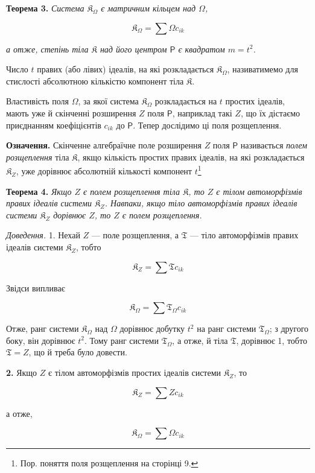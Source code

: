 \documentclass[11pt]{article}
\newcommand{\srcfn}[2]{\footnote{#2}}
\begin{document}
\textbf{Теорема 3.} \emph{Система \(\mathfrak K_\Omega\) є матричним кільцем над \(\Omega\),}

\[
\mathfrak K_\Omega=\sum\Omega c_{ik}
\]

\emph{а отже, степінь тіла \(\mathfrak K\) над його центром \(\mathsf P\) є квадратом \(m=t^2\).}

Число \(t\) правих (або лівих) ідеалів, на які розкладається \(\mathfrak K_\Omega\), називатимемо для стислості абсолютною кількістю компонент тіла \(\mathfrak K\).

Властивість поля \(\Omega\), за якої система \(\mathfrak K_\Omega\) розкладається на \(t\) простих ідеалів, мають уже й скінченні розширення \(Z\) поля \(\mathsf P\), наприклад такі \(Z\), що їх дістаємо приєднанням коефіцієнтів \(c_{ik}\) до \(\mathsf P\). Тепер дослідимо ці поля розщеплення.

\textbf{Означення.} Скінченне алгебраїчне поле розширення \(Z\) поля \(\mathsf P\) називається \emph{полем розщеплення} тіла \(\mathfrak K\), якщо кількість простих правих ідеалів, на які розкладається \(\mathfrak K_Z\), уже дорівнює абсолютній кількості компонент \(t\)\srcfn{1}{Пор. поняття поля розщеплення на сторінці 9.}

\textbf{Теорема 4.} \emph{Якщо \(Z\) є полем розщеплення тіла \(\mathfrak K\), то \(Z\) є тілом автоморфізмів правих ідеалів системи \(\mathfrak K_Z\). Навпаки, якщо тіло автоморфізмів правих ідеалів системи \(\mathfrak K_Z\) дорівнює \(Z\), то \(Z\) є полем розщеплення.}

\emph{Доведення.} 1. Нехай \(Z\) --- поле розщеплення, а \(\mathfrak T\) --- тіло автоморфізмів правих ідеалів системи \(\mathfrak K_Z\), тобто

\[
\mathfrak K_Z=\sum\mathfrak T c_{ik}
\]

Звідси випливає

\[
\mathfrak K_\Omega=\sum\mathfrak T_\Omega c_{ik}
\]

Отже, ранг системи \(\mathfrak K_\Omega\) над \(\Omega\) дорівнює добутку \(t^2\) на ранг системи \(\mathfrak T_\Omega\); з другого боку, він дорівнює \(t^2\). Тому ранг системи \(\mathfrak T_\Omega\), а отже, й тіла \(\mathfrak T\), дорівнює 1, тобто \(\mathfrak T=Z\), що й треба було довести.

\textbf{2.} Якщо \(Z\) є тілом автоморфізмів простих ідеалів системи \(\mathfrak K_Z\), то

\[
\mathfrak K_Z=\sum Zc_{ik}
\]

а отже,

\[
\mathfrak K_\Omega=\sum\Omega c_{ik}
\]
\end{document}

